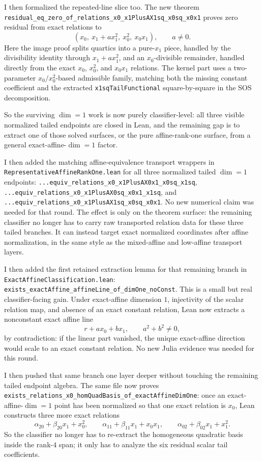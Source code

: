 \documentclass[11pt]{article}
\begin{document}
I then formalized the repeated-line slice too. The new theorem
\texttt{residual\_eq\_zero\_of\_relations\_x0\_x1PlusAX1sq\_x0sq\_x0x1}
proves zero residual from exact relations to
\[
  (x_0,\ x_1 + a x_1^2,\ x_0^2,\ x_0x_1),\qquad a \ne 0.
\]
Here the image proof splits quartics into a pure-\(x_1\) piece, handled by the
divisibility identity through \(x_1 + a x_1^2\), and an \(x_0\)-divisible
remainder, handled directly from the exact \(x_0\), \(x_0^2\), and \(x_0x_1\)
relations. The kernel part uses a two-parameter \(x_0/x_0^2\)-based admissible
family, matching both the missing constant coefficient and the extracted
\texttt{x1sqTailFunctional} square-by-square in the SOS decomposition.

So the surviving \(\dim=1\) work is now purely classifier-level: all three
visible normalized tailed endpoints are closed in Lean, and the remaining gap
is to extract one of those solved surfaces, or the pure affine-rank-one
surface, from a general exact-affine-\(\dim=1\) factor.

I then added the matching affine-equivalence transport wrappers in
\texttt{RepresentativeAffineRankOne.lean} for all three normalized tailed
\(\dim=1\) endpoints:
\texttt{...equiv\_relations\_x0\_x1PlusAX0x1\_x0sq\_x1sq},
\texttt{...equiv\_relations\_x0\_x1PlusAX0sq\_x0x1\_x1sq}, and
\texttt{...equiv\_relations\_x0\_x1PlusAX1sq\_x0sq\_x0x1}. No new numerical
claim was needed for that round. The effect is only on the theorem surface:
the remaining classifier no longer has to carry raw transported relation data
for these three tailed branches. It can instead target exact normalized
coordinates after affine normalization, in the same style as the mixed-affine
and low-affine transport layers.

I then added the first retained extraction lemma for that remaining branch in
\texttt{ExactAffineClassification.lean}:
\texttt{exists\_exactAffine\_affineLine\_of\_dimOne\_noConst}. This is a small
but real classifier-facing gain. Under exact-affine dimension \(1\), injectivity
of the scalar relation map, and absence of an exact constant relation, Lean now
extracts a nonconstant exact affine line
\[
  r + a x_0 + b x_1,\qquad a^2+b^2 \ne 0,
\]
by contradiction: if the linear part vanished, the unique exact-affine
direction would scale to an exact constant relation. No new Julia evidence was
needed for this round.

I then pushed that same branch one layer deeper without touching the remaining
tailed endpoint algebra. The same file now proves
\texttt{exists\_relations\_x0\_homQuadBasis\_of\_exactAffineDimOne}: once an
exact-affine-\(\dim=1\) point has been normalized so that one exact relation is
\(x_0\), Lean constructs three more exact relations
\[
  \alpha_{20} + \beta_{20}x_1 + x_0^2,\qquad
  \alpha_{11} + \beta_{11}x_1 + x_0x_1,\qquad
  \alpha_{02} + \beta_{02}x_1 + x_1^2.
\]
So the classifier no longer has to re-extract the homogeneous quadratic basis
inside the rank-\(4\) span; it only has to analyze the six residual scalar tail
coefficients.
\end{document}
